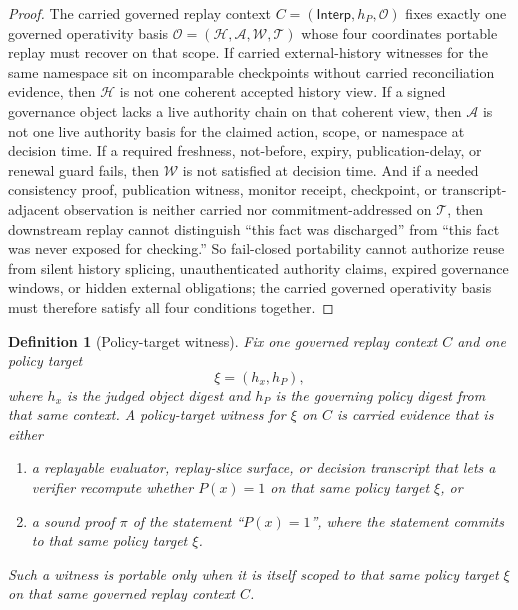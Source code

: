 \documentclass[11pt]{article}
\newtheorem{definition}{Definition}
\newcommand{\Interp}{\mathsf{Interp}}
\newcommand{\Window}{\mathcal{W}}
\begin{document}
\begin{proof}
The carried governed replay context $C=(\Interp,h_P,\mathcal{O})$ fixes exactly one governed operativity basis $\mathcal{O}=(\mathcal{H},\mathcal{A},\Window,\mathcal{T})$ whose four coordinates portable replay must recover on that scope.
If carried external-history witnesses for the same namespace sit on incomparable checkpoints without carried reconciliation evidence, then $\mathcal{H}$ is not one coherent accepted history view.
If a signed governance object lacks a live authority chain on that coherent view, then $\mathcal{A}$ is not one live authority basis for the claimed action, scope, or namespace at decision time.
If a required freshness, not-before, expiry, publication-delay, or renewal guard fails, then $\Window$ is not satisfied at decision time.
And if a needed consistency proof, publication witness, monitor receipt, checkpoint, or transcript-adjacent observation is neither carried nor commitment-addressed on $\mathcal{T}$, then downstream replay cannot distinguish ``this fact was discharged'' from ``this fact was never exposed for checking.''
So fail-closed portability cannot authorize reuse from silent history splicing, unauthenticated authority claims, expired governance windows, or hidden external obligations; the carried governed operativity basis must therefore satisfy all four conditions together.
\end{proof}

\begin{definition}[Policy-target witness]
Fix one governed replay context $C$ and one policy target
\[
\xi=(h_x,h_P),
\]
where $h_x$ is the judged object digest and $h_P$ is the governing policy digest from that same context.
A \emph{policy-target witness} for $\xi$ on $C$ is carried evidence that is either
\begin{enumerate}[label=(\alph*),leftmargin=2.5em]
  \item a replayable evaluator, replay-slice surface, or decision transcript that lets a verifier recompute whether $P(x)=1$ on that same policy target $\xi$, or
  \item a sound proof $\pi$ of the statement ``$P(x)=1$'', where the statement commits to that same policy target $\xi$.
\end{enumerate}
Such a witness is portable only when it is itself scoped to that same policy target $\xi$ on that same governed replay context $C$.
\end{definition}
\end{document}
